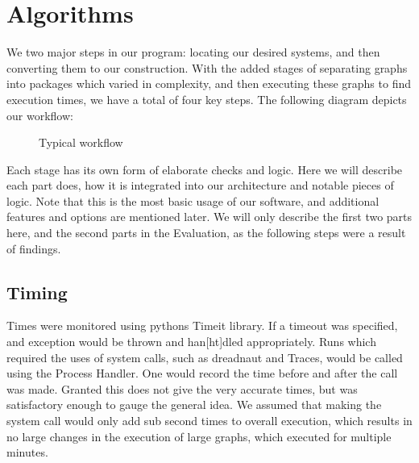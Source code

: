 \section{Algorithms}
We two major steps in our program: locating our desired systems, and then converting them to our construction. With the added stages of separating graphs into packages which varied in complexity, and then executing these graphs to find execution times, we have a total of four key steps. The following diagram depicts our workflow:

\begin{figure}[h]
	\centering
	\caption{Typical workflow}
	
	
\end{figure}
Each stage has its own form of elaborate checks and logic. Here we will describe each part does, how it is integrated into our architecture and notable pieces of logic. Note that this is the most basic usage of our software, and additional features and options are mentioned later. We will only describe the first two parts here, and the second parts in the Evaluation, as the following steps were a result of findings. 

\subsection{Timing}
Times were monitored using pythons Timeit library. If a timeout was specified, and exception would be thrown and han[ht]dled appropriately. Runs which required the uses of system calls, such as dreadnaut and Traces, would be called using the Process Handler. One would record the time before and after the call was made. Granted this does not give the very accurate times, but was satisfactory enough to gauge the general idea. We assumed that making the system call would only add sub second times to overall execution, which results in no large changes in the execution of large graphs, which executed for multiple minutes. 
\newpage
